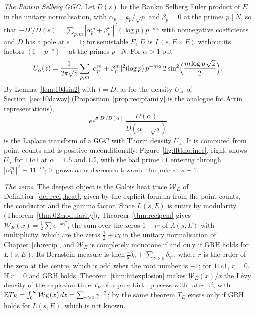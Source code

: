 \emph{The Rankin Selberg GGC.} Let $D(s)$ be the Rankin Selberg Euler product of $E$ in the unitary normalisation, with $\alpha_p=a_p/\sqrt p$ and $\beta_p=0$ at the primes $p\mid N$, so that $-D'/D(s)=\sum_{p,m}|\alpha_p^m+\beta_p^m|^2(\log p)p^{-ms}$ with nonnegative coefficients and $D$ has a pole at $s=1$; for semistable $E$, $D$ is $L(s,E\times E)$ without its factors $(1-p^{-s})^{-1}$ at the primes $p\mid N$. For $\alpha>1$ put
\[
U_\alpha(z)=\frac1{2\pi\sqrt z}\sum_{p,m}|\alpha_p^m+\beta_p^m|^2(\log p)\,p^{-m\alpha}\,2\sin^2\Bigl(\frac{m\log p\,\sqrt z}2\Bigr).
\]
By Lemma~\ref{lem:10dsin2} with $f=D$, as for the density $U_{\mathrm{ar}}$ of Section~\ref{sec:10daway} (Proposition~\ref{prop:recipfamily} is the analogue for Artin representations),
\[
e^{\sqrt s\,D'/D(\alpha)}\,\frac{D(\alpha)}{D(\alpha+\sqrt s)}
\]
is the Laplace transform of a GGC with Thorin density $U_\alpha$. It is computed from point counts and is positive unconditionally. Figure~\ref{fig:fltthorinec}, right, shows $U_\alpha$ for $11a1$ at $\alpha=1.5$ and $1.2$, with the bad prime $11$ entering through $|\alpha_{11}^m|^2=11^{-m}$; it grows as $\alpha$ decreases towards the pole at $s=1$.

\emph{The zeros.} The deepest object is the Galois heat trace $\mathcal W_E$ of Definition~\ref{def:recipheat}, given by the explicit formula from the point counts, the conductor and the gamma factor. Since $L(s,E)$ is entire by modularity (Theorem~\ref{thm:02modularity}), Theorem~\ref{thm:recipcm} gives $\mathcal W_E(x)=\frac12\sum e^{-x\gamma^2}$, the sum over the zeros $1+i\gamma$ of $\Lambda(s,E)$ with multiplicity, which are the zeros $\frac12+i\gamma$ in the unitary normalisation of Chapter~\ref{ch:recip}, and $\mathcal W_E$ is completely monotone if and only if GRH holds for $L(s,E)$. Its Bernstein measure is then $\frac r2\delta_0+\sum_{\gamma>0}\delta_{\gamma^2}$, where $r$ is the order of the zero at the centre, which is odd when the root number is $-1$; for $11a1$, $r=0$. If $r=0$ and GRH holds, Theorem~\ref{thm:hitexplosion} makes $\mathcal W_E(x)/x$ the L\'evy density of the explosion time $T_E$ of a pure birth process with rates $\gamma^2$, with $\mathbb{E} T_E=\int_0^\infty\mathcal W_E(x)\,dx=\sum_{\gamma>0}\gamma^{-2}$; by the same theorem $T_E$ exists only if GRH holds for $L(s,E)$, which is not known.

